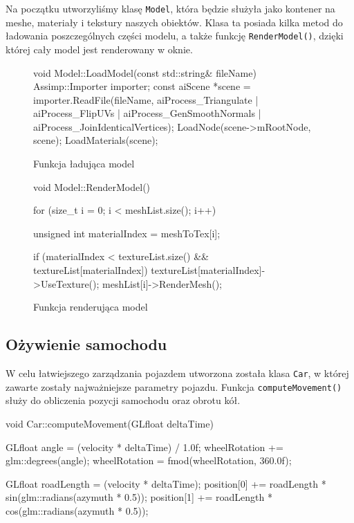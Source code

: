 \documentclass[a4paper,12pt]{article}
\numberwithin{equation}{section}
\begin{document}
Na początku utworzyliśmy klasę \texttt{Model}, która będzie służyła jako kontener na meshe, materiały i tekstury naszych obiektów. Klasa ta posiada kilka metod do ładowania poszczególnych części modelu, a także funkcję \texttt{RenderModel()}, dzięki której cały model jest renderowany w oknie.

\begin{figure}[H]
\begin{cppcode}
void Model::LoadModel(const std::string& fileName)
{
	Assimp::Importer importer;
	const aiScene *scene = importer.ReadFile(fileName, aiProcess_Triangulate | aiProcess_FlipUVs | aiProcess_GenSmoothNormals | aiProcess_JoinIdenticalVertices);
	LoadNode(scene->mRootNode, scene);
	LoadMaterials(scene);
}
\end{cppcode}
\caption{Funkcja ładująca model}
\end{figure}

\begin{figure}[H]
\begin{cppcode}
void Model::RenderModel()
{
	for (size_t i = 0; i < meshList.size(); i++) {
		unsigned int materialIndex = meshToTex[i];

		if (materialIndex < textureList.size() && textureList[materialIndex]) {
			textureList[materialIndex]->UseTexture();
		}
		meshList[i]->RenderMesh();
	}
}
\end{cppcode}
\caption{Funkcja renderująca model}
\end{figure}



\subsection{Ożywienie samochodu}

W celu łatwiejszego zarządzania pojazdem utworzona została klasa \texttt{Car}, w której zawarte zostały najważniejsze parametry pojazdu. Funkcja \texttt{computeMovement()} służy do obliczenia pozycji samochodu oraz obrotu kół.

\begin{cppcode}
void Car::computeMovement(GLfloat deltaTime)
{
	GLfloat angle = (velocity * deltaTime) / 1.0f;
	wheelRotation += glm::degrees(angle);
	wheelRotation = fmod(wheelRotation, 360.0f);

	GLfloat roadLength = (velocity * deltaTime);
	position[0] += roadLength * sin(glm::radians(azymuth * 0.5));
	position[1] += roadLength * cos(glm::radians(azymuth * 0.5));
}
\end{cppcode}
\end{document}
